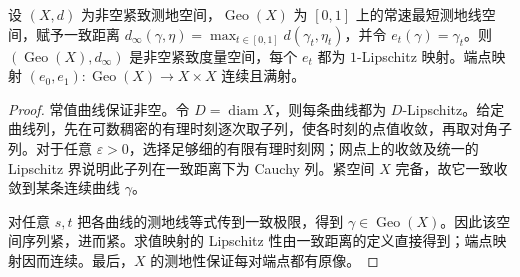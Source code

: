 \begin{lemma}\label{g3:lem:C-geodesic-space-compact}
	设 \((X,d)\) 为非空紧致测地空间，\(\operatorname{Geo}(X)\) 为 \([0,1]\) 上的常速最短测地线空间，赋予一致距离 \(d_\infty(\gamma,\eta)=\max_{t\in[0,1]}d(\gamma_t,\eta_t)\)，并令 \(e_t(\gamma)=\gamma_t\)。则
	\((\operatorname{Geo}(X),d_\infty)\) 是非空紧致度量空间，每个 \(e_t\) 都为 \(1\)-Lipschitz 映射。端点映射
	\((e_0,e_1):\operatorname{Geo}(X)\rightarrow X\times X\) 连续且满射。
\end{lemma}
\begin{proof}
	常值曲线保证非空。令 \(D=\operatorname{diam}X\)，则每条曲线都为 \(D\)-Lipschitz。给定曲线列，先在可数稠密的有理时刻逐次取子列，使各时刻的点值收敛，再取对角子列。对于任意 \(\varepsilon>0\)，选择足够细的有限有理时刻网；网点上的收敛及统一的 Lipschitz 界说明此子列在一致距离下为 Cauchy 列。紧空间 \(X\) 完备，故它一致收敛到某条连续曲线 \(\gamma\)。

	对任意 \(s,t\) 把各曲线的测地线等式传到一致极限，得到 \(\gamma\in\operatorname{Geo}(X)\)。因此该空间序列紧，进而紧。求值映射的 Lipschitz 性由一致距离的定义直接得到；端点映射因而连续。最后，\(X\) 的测地性保证每对端点都有原像。
\end{proof}

